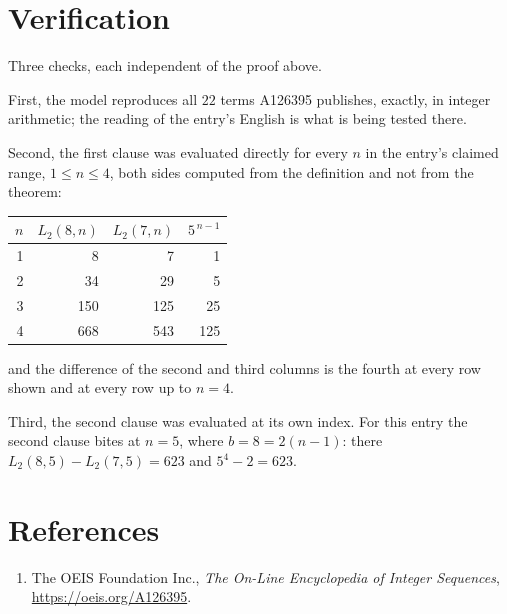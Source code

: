 \documentclass[11pt,a4paper]{article}
\theoremstyle{plain}
\theoremstyle{definition}
\begin{document}
\section{Verification}

Three checks, each independent of the proof above.

First, the model reproduces all $22$ terms A126395 publishes, exactly, in integer
arithmetic; the reading of the entry's English is what is being tested there.

Second, the first clause was evaluated directly for every $n$ in the entry's claimed range,
$1\le n\le4$, both sides computed from the definition and not from the theorem:

\begin{center}
\begin{tabular}{rrrr}
$n$ & $L_{2}(8,n)$ & $L_{2}(7,n)$ & $5^{\,n-1}$ \\ \hline
1 & 8 & 7 & 1 \\
2 & 34 & 29 & 5 \\
3 & 150 & 125 & 25 \\
4 & 668 & 543 & 125 \\
\end{tabular}
\end{center}

\noindent and the difference of the second and third columns is the fourth at every row shown
and at every row up to $n=4$.

Third, the second clause was evaluated at its own index. For this entry the second clause bites at $n=5$, where $b=8=2(n-1)$: there $L_{2}(8,5)-L_{2}(7,5)=623$ and $5^{4}-2=623$.

\section*{References}
\begin{enumerate}
\item The OEIS Foundation Inc., \emph{The On-Line Encyclopedia of Integer Sequences},
\url{https://oeis.org/A126395}.
\end{enumerate}
\end{document}
